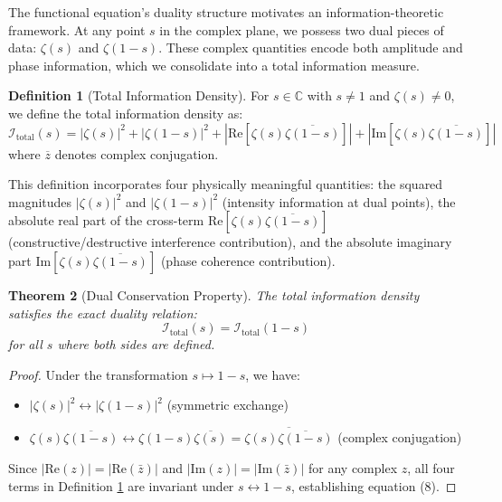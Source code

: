 \documentclass[12pt]{article}
\theoremstyle{plain}
\newtheorem{theorem}{Theorem}[section]
\theoremstyle{definition}
\newtheorem{definition}[theorem]{Definition}
\begin{document}
The functional equation's duality structure motivates an information-theoretic framework. At any point $s$ in the complex plane, we possess two dual pieces of data: $\zeta(s)$ and $\zeta(1-s)$. These complex quantities encode both amplitude and phase information, which we consolidate into a total information measure.

\begin{definition}[Total Information Density]\label{def:total_info}
For $s \in \mathbb{C}$ with $s \neq 1$ and $\zeta(s) \neq 0$, we define the total information density as:
\begin{equation}
\mathcal{I}_{\text{total}}(s) = |\zeta(s)|^2 + |\zeta(1-s)|^2 + \left|\text{Re}\left[\zeta(s)\overline{\zeta(1-s)}\right]\right| + \left|\text{Im}\left[\zeta(s)\overline{\zeta(1-s)}\right]\right|
\end{equation}
where $\overline{z}$ denotes complex conjugation.
\end{definition}

This definition incorporates four physically meaningful quantities: the squared magnitudes $|\zeta(s)|^2$ and $|\zeta(1-s)|^2$ (intensity information at dual points), the absolute real part of the cross-term $\text{Re}[\zeta(s)\overline{\zeta(1-s)}]$ (constructive/destructive interference contribution), and the absolute imaginary part $\text{Im}[\zeta(s)\overline{\zeta(1-s)}]$ (phase coherence contribution).

\begin{theorem}[Dual Conservation Property]\label{thm:dual_conservation}
The total information density satisfies the exact duality relation:
\begin{equation}
\mathcal{I}_{\text{total}}(s) = \mathcal{I}_{\text{total}}(1-s)
\end{equation}
for all $s$ where both sides are defined.
\end{theorem}

\begin{proof}
Under the transformation $s \mapsto 1-s$, we have:
\begin{itemize}
\item $|\zeta(s)|^2 \leftrightarrow |\zeta(1-s)|^2$ (symmetric exchange)
\item $\zeta(s)\overline{\zeta(1-s)} \leftrightarrow \zeta(1-s)\overline{\zeta(s)} = \overline{\zeta(s)\overline{\zeta(1-s)}}$ (complex conjugation)
\end{itemize}
Since $|\text{Re}(z)| = |\text{Re}(\bar{z})|$ and $|\text{Im}(z)| = |\text{Im}(\bar{z})|$ for any complex $z$, all four terms in Definition \ref{def:total_info} are invariant under $s \leftrightarrow 1-s$, establishing equation (8).
\end{proof}
\end{document}
